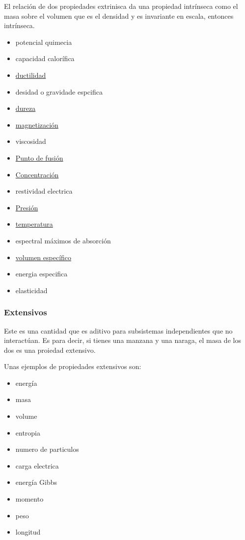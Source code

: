 \documentclass[11pt]{article}
\begin{document}
El relaci\'on de dos propiedades extrinisca da una propiedad intr\'inseca como el masa sobre el volumen que es el densidad y es invariante en escala, entonces intr\'inseca. 

\begin{multicols}{2}
\begin{itemize}
    \item potencial quimecia
    \item capacidad calor\'ifica
    \item \href{https://en.wikipedia.org/wiki/Malleability}{ductilidad}
    \item desidad o gravidade espcifica
    \item \href{https://en.wikipedia.org/wiki/Hardness}{dureza}
    \item \href{https://en.wikipedia.org/wiki/Magnetization}{magnetizaci\'on}
    \item viscosidad
    \item \href{https://en.wikipedia.org/wiki/Melting_point}{Punto de fusi\'on}
    \item \href{https://en.wikipedia.org/wiki/Concentration}{Concentraci\'on}
    \item restividad electrica
    \item \href{https://en.wikipedia.org/wiki/Pressure}{Presi\'on}
    \item \href{https://en.wikipedia.org/wiki/Temperature}{temperatura}
    \item espectral máximos de absorción
    \item \href{https://en.wikipedia.org/wiki/Specific_volume}{volumen específico}
    \item energia especifica
    \item elasticidad
\end{itemize}
\end{multicols}

\subsubsection{Extensivos}

Este es una cantidad que es aditivo para subsistemas independientes que no interactúan. 
Es para decir, si tienes una manzana y una naraga, el masa de los dos es una proiedad extensivo. 

Unas ejemplos de propiedades extensivos son:

\begin{multicols}{2}
\begin{itemize}
	\item energ\'ia
	\item masa
	\item volume
	\item entropia
	\item numero de particulos
	\item carga electrica
	\item energ\'ia Gibbs
	\item momento 
	\item peso
	\item longitud
\end{itemize}
\end{multicols}
\end{document}
